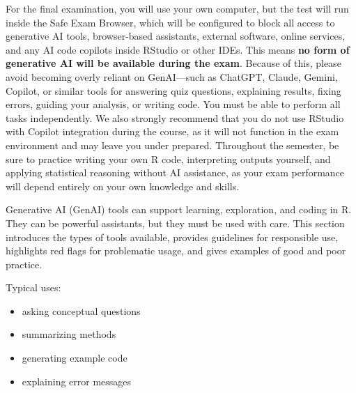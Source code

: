 \documentclass[
  letterpaper,
  8pt,
  a4paper]{book}
\providecommand{\tightlist}{%
  \setlength{\itemsep}{0pt}\setlength{\parskip}{0pt}}
\begin{document}
\begin{tcolorbox}[enhanced jigsaw, arc=.35mm, bottomrule=.15mm, bottomtitle=1mm, breakable, colback=white, colbacktitle=quarto-callout-important-color!10!white, colframe=quarto-callout-important-color-frame, coltitle=black, left=2mm, leftrule=.75mm, opacityback=0, opacitybacktitle=0.6, rightrule=.15mm, title=\textcolor{quarto-callout-important-color}{\faExclamation}\hspace{0.5em}{Important}, titlerule=0mm, toprule=.15mm, toptitle=1mm]

For the final examination, you will use your own computer, but the test
will run inside the Safe Exam Browser, which will be configured to block
all access to generative AI tools, browser-based assistants, external
software, online services, and any AI code copilots inside RStudio or
other IDEs. This means \textbf{no form of generative AI will be
available during the exam}. Because of this, please avoid becoming
overly reliant on GenAI---such as ChatGPT, Claude, Gemini, Copilot, or
similar tools for answering quiz questions, explaining results, fixing
errors, guiding your analysis, or writing code. You must be able to
perform all tasks independently. We also strongly recommend that you do
not use RStudio with Copilot integration during the course, as it will
not function in the exam environment and may leave you under prepared.
Throughout the semester, be sure to practice writing your own R code,
interpreting outputs yourself, and applying statistical reasoning
without AI assistance, as your exam performance will depend entirely on
your own knowledge and skills.

\end{tcolorbox}

Generative AI (GenAI) tools can support learning, exploration, and
coding in R. They can be powerful assistants, but they must be used with
care. This section introduces the types of tools available, provides
guidelines for responsible use, highlights red flags for problematic
usage, and gives examples of good and poor practice.

Typical uses:

\begin{itemize}
\tightlist
\item
  asking conceptual questions\\
\item
  summarizing methods\\
\item
  generating example code\\
\item
  explaining error messages
\end{itemize}
\end{document}
